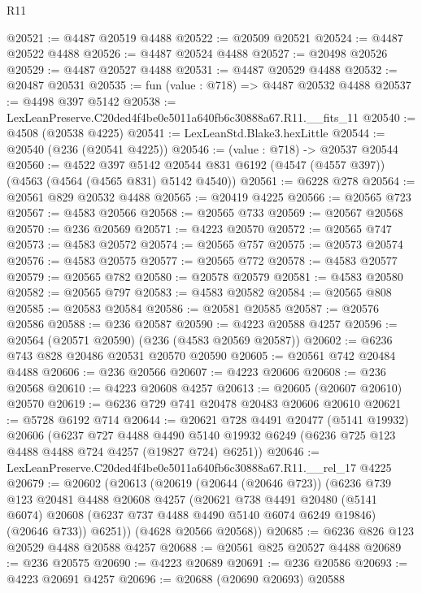 \begin{lexlean}{R11}
\begin{coremodule}
@20521 := @4487 @20519 @4488
@20522 := @20509 @20521
@20524 := @4487 @20522 @4488
@20526 := @4487 @20524 @4488
@20527 := @20498 @20526
@20529 := @4487 @20527 @4488
@20531 := @4487 @20529 @4488
@20532 := @20487 @20531
@20535 := fun (value : @718) => @4487 @20532 @4488
@20537 := @4498 @397 @5142
@20538 := LexLeanPreserve.C20ded4f4be0e5011a640fb6c30888a67.R11.__fits_11
@20540 := @4508 (@20538 @4225)
@20541 := LexLeanStd.Blake3.hexLittle
@20544 := @20540 (@236 (@20541 @4225))
@20546 := (value : @718) -> @20537 @20544
@20560 := @4522
    @397
    @5142
    @20544
    @831
    @6192
    (@4547 (@4557 @397))
    (@4563 (@4564 (@4565 @831) @5142 @4540))
@20561 := @6228 @278
@20564 := @20561 @829 @20532 @4488
@20565 := @20419 @4225
@20566 := @20565 @723
@20567 := @4583 @20566
@20568 := @20565 @733
@20569 := @20567 @20568
@20570 := @236 @20569
@20571 := @4223 @20570
@20572 := @20565 @747
@20573 := @4583 @20572
@20574 := @20565 @757
@20575 := @20573 @20574
@20576 := @4583 @20575
@20577 := @20565 @772
@20578 := @4583 @20577
@20579 := @20565 @782
@20580 := @20578 @20579
@20581 := @4583 @20580
@20582 := @20565 @797
@20583 := @4583 @20582
@20584 := @20565 @808
@20585 := @20583 @20584
@20586 := @20581 @20585
@20587 := @20576 @20586
@20588 := @236 @20587
@20590 := @4223 @20588 @4257
@20596 := @20564 (@20571 @20590) (@236 (@4583 @20569 @20587))
@20602 := @6236 @743 @828 @20486 @20531 @20570 @20590
@20605 := @20561 @742 @20484 @4488
@20606 := @236 @20566
@20607 := @4223 @20606
@20608 := @236 @20568
@20610 := @4223 @20608 @4257
@20613 := @20605 (@20607 @20610) @20570
@20619 := @6236 @729 @741 @20478 @20483 @20606 @20610
@20621 := @5728 @6192 @714
@20644 := @20621
    @728
    @4491
    @20477
    (@5141 @19932)
    @20606
    (@6237
      @727
      @4488
      @4490
      @5140
      @19932
      @6249
      (@6236 @725 @123 @4488 @4488 @724 @4257 (@19827 @724) @6251))
@20646 := LexLeanPreserve.C20ded4f4be0e5011a640fb6c30888a67.R11.__rel_17 @4225
@20679 := @20602
    (@20613
      (@20619
        (@20644 (@20646 @723))
        (@6236
          @739
          @123
          @20481
          @4488
          @20608
          @4257
          (@20621
            @738
            @4491
            @20480
            (@5141 @6074)
            @20608
            (@6237 @737 @4488 @4490 @5140 @6074 @6249 @19846)
            (@20646 @733))
          @6251))
      (@4628 @20566 @20568))
@20685 := @6236 @826 @123 @20529 @4488 @20588 @4257
@20688 := @20561 @825 @20527 @4488
@20689 := @236 @20575
@20690 := @4223 @20689
@20691 := @236 @20586
@20693 := @4223 @20691 @4257
@20696 := @20688 (@20690 @20693) @20588

\end{coremodule}
\end{lexlean}
